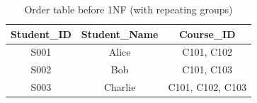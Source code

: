\begin{table}[h!]
\centering
\caption{Order table before 1NF (with repeating groups)}
\label{tab:order_before_1nf}
\begin{tabular}{|c|c|c|}
\hline
\textbf{Student\_ID} & \textbf{Student\_Name} & \textbf{Course\_ID} \\
\hline
S001 & Alice & C101, C102 \\
\hline
S002 & Bob & C101, C103 \\
\hline
S003 & Charlie & C101, C102, C103\\
\hline
\end{tabular}
\end{table}
